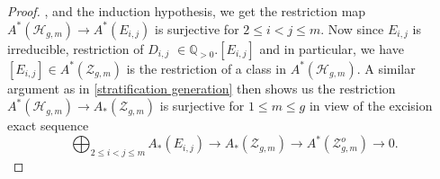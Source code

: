 \documentclass[11pt]{amsart}
\theoremstyle{definition}
\begin{document}
\begin{proof}
, and the induction hypothesis, we get the restriction map $A^* (\mathcal H_{g,m}) \rightarrow A^* (E_{i,j})$ is surjective for $2\leq i< j\leq m$. Now since $E_{i,j}$ is irreducible, restriction of $D_{i,j}$ $\in \mathbb Q_{>0}. [E_{i,j}]$ and in particular, we have $[E_{i,j}]\in A^*(\mathcal Z_{g,m})$ is the restriction of a class in $A^* (\mathcal H_{g,m})$. A similar argument as in \ref{stratification generation} then shows us the restriction $A^* (\mathcal H_{g,m}) \rightarrow A_* (\mathcal Z_{g,m})$ is surjective for $1\leq m \leq g$ in view of the excision exact sequence $$ \bigoplus_{2\leq i< j\leq m} A_* (E_{i,j}) \rightarrow A_* (\mathcal Z_{g,m}) \rightarrow A^* (\mathcal Z^o_{g,m})\rightarrow 0.$$ 


\end{proof}
\end{document}
